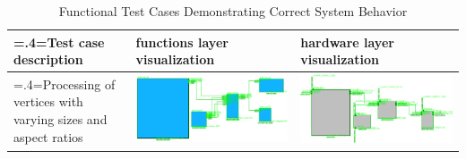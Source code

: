\begin{table}[H]
    \caption{Functional Test Cases Demonstrating Correct System Behavior}
    \label{tab:functional_test_cases_no_errors}
    \begin{tabularx}{\textwidth}{@{}>{\hsize=.4\hsize\linewidth=\hsize}X m{} m{}@{}}
        \toprule
        Test case description & functions layer visualization & hardware layer visualization \\ 
        \midrule
        Processing of vertices with varying sizes and aspect ratios &  
        \includegraphics[width=\linewidth]{pictures/correct_task_size_input_clip.png} & 
        \includegraphics[width=\linewidth]{pictures/correct_task_size_output_clip.png} \\


\end{tabularx}
\end{table}
